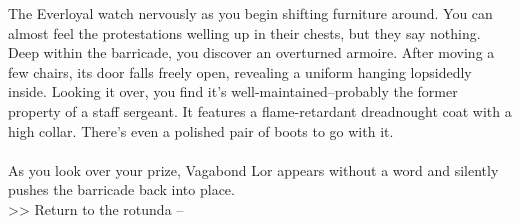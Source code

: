The Everloyal watch nervously as you begin shifting furniture around. You can almost feel the protestations welling up in their chests, but they say nothing.\\

Deep within the barricade, you discover an overturned armoire. After moving a few chairs, its door falls freely open, revealing a uniform hanging lopsidedly inside. Looking it over, you find it's well-maintained--probably the former property of a staff sergeant. It features a flame-retardant dreadnought coat with a high collar. There's even a polished pair of boots to go with it.\\
\\

As you look over your prize, Vagabond Lor appears without a word and silently pushes the barricade back into place.\\

>> Return to the rotunda -- 